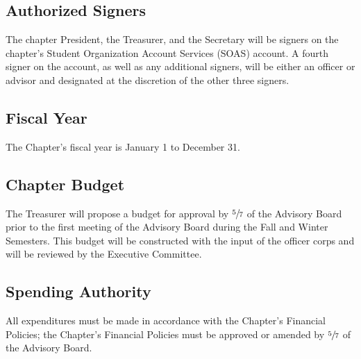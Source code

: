 \subsection{Authorized Signers} \label{VII.3}

The chapter President, the Treasurer, and the
Secretary will be signers on the chapter’s Student Organization Account Services (SOAS)
account. A fourth signer on the account, as well as any additional signers, will be either an
officer or advisor and designated at the discretion of the other three signers.


\subsection{Fiscal Year} \label{VII.4}

The Chapter’s fiscal year is January 1 to December 31.


\subsection{Chapter Budget} \label{VII.5}

The Treasurer will propose a budget for approval by $\sfrac{5}{7}$
of the Advisory Board prior to the first meeting of the Advisory Board during the Fall
and Winter Semesters. This budget will be constructed with the input of the officer corps
and will be reviewed by the Executive Committee.


\subsection{Spending Authority} \label{VII.6}

All expenditures must be made in accordance
with the Chapter’s Financial Policies; the Chapter’s Financial Policies must be approved or
amended by $\sfrac{5}{7}$ of the Advisory Board.